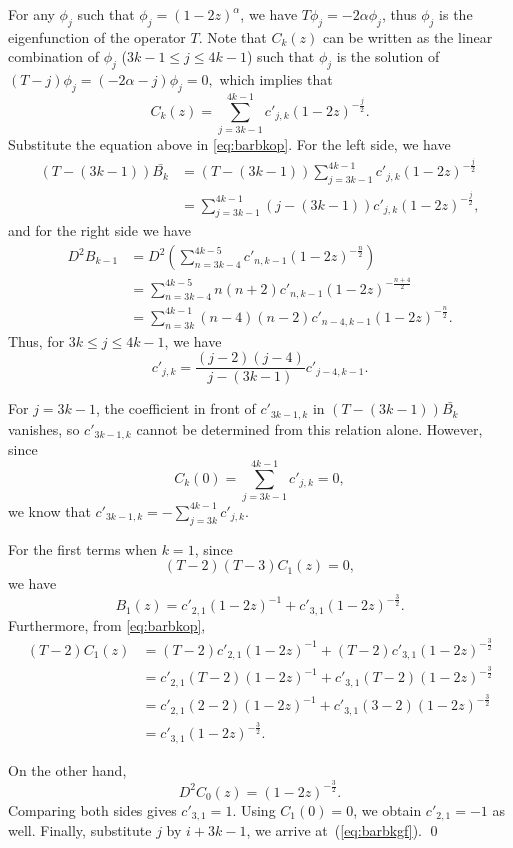 \documentclass[a4paper,UKenglish,cleveref, autoref, thm-restate]{lipics-v2021}
\begin{document}
For any $\phi_j$ such that $\phi_j=(1-2z)^\alpha$, we have $T\phi_j=-2\alpha\phi_j$, thus $\phi_j$ is the eigenfunction of the operator $T$. Note that $ {C}_k(z)$ can be written as the linear combination  of $\phi_j$ ($3k-1 \leq j \leq 4k-1$) such that $\phi_j$ is the  solution of 
$(T-j) \phi_j=(-2\alpha-j)\phi_j=0,$     which implies that  \[ {C}_k(z)=\sum_{j=3k-1}^{4k-1}c'_{j,k} (1-2z)^{-\frac{j}{2}}. \] 
Substitute the equation above in \eqref{eq:barbkop}. For the left side, we have
\begin{align*}
(T-(3k-1))\bar{B_k}
  &= (T-(3k-1))\sum_{j=3k-1}^{4k-1}c'_{j,k} (1-2z)^{-\tfrac{j}{2}} \\
  &= \sum_{j=3k-1}^{4k-1} (j-(3k-1))c'_{j,k} (1-2z)^{-\tfrac{j}{2}},
\end{align*}
and for the right side we have
\begin{align*}
D^2B_{k-1}
  &= D^2\!\left(\sum_{n=3k-4}^{4k-5}c'_{n,k-1} (1-2z)^{-\tfrac{n}{2}}\right) \\
  &= \sum_{n=3k-4}^{4k-5} n(n+2)c'_{n,k-1} (1-2z)^{-\tfrac{n+4}{2}} \\
  &= \sum_{n=3k}^{4k-1} (n-4)(n-2)c'_{n-4,k-1} (1-2z)^{-\tfrac{n}{2}}.
\end{align*}
Thus, for $3k \leq j \leq 4k-1$, we have
\[
c'_{j,k} = \frac{(j-2)(j-4)}{j-(3k-1)}c'_{j-4,k-1}.
\]

For $j=3k-1$, the coefficient in front of $c'_{3k-1,k}$ in $(T-(3k-1))\bar{B_k}$ vanishes, so $c'_{3k-1,k}$ cannot be determined from this relation alone. However, since
\[
{C}_k(0)=\sum_{j=3k-1}^{4k-1}c'_{j,k}=0,
\]
we know that $c'_{3k-1,k} = - \displaystyle \sum_{j=3k}^{4k-1} c'_{j,k}.$

For the first terms when $k=1$, since \[(T-2)(T-3) {C}_1(z)=0,\] we have \[B_1(z)=c'_{2,1}(1-2z)^ {-1}+c'_{3,1}(1-2z)^{-\frac{3}{2}}.\] Furthermore, from \eqref{eq:barbkop},
\begin{align*}
(T-2){C}_1(z)&=(T-2)c'_{2,1}(1-2z)^{-1} + (T-2)c'_{3,1}(1-2z)^{-\tfrac{3}{2}}\\&=c'_{2,1}(T-2)(1-2z)^{-1}+ c'_{3,1} (T-2)(1-2z)^{-\tfrac{3}{2}} \\&
  = c'_{2,1}(2-2)(1-2z)^{-1} + c'_{3,1}(3-2)(1-2z)^{-\tfrac{3}{2}} \\
  &= c'_{3,1}(1-2z)^{-\tfrac{3}{2}}.
\end{align*}

On the other hand,
\[
D^2{C}_0(z) = (1-2z)^{-\tfrac{3}{2}}.
\]
Comparing both sides gives \(c'_{3,1}=1\). Using ${C}_1(0)=0$, we obtain $c'_{2,1}=-1$ as well. Finally, substitute $j$ by $i+3k-1$, we arrive at~(\ref{eq:barbkgf}).
\qed
\end{document}
